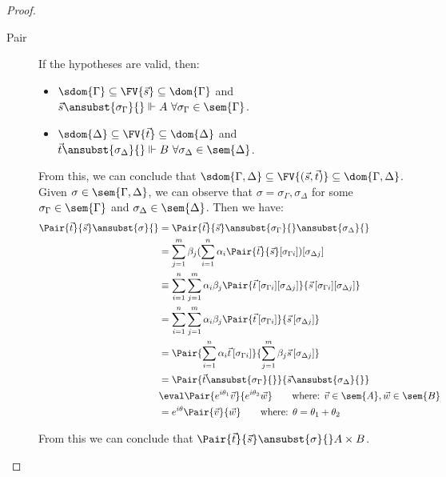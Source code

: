 \begin{proof}
\begin{description}
    \item[Pair] If the hypotheses are valid, then:

    \begin{itemize}
        \item $\sdom{\Gamma}\subseteq \FV{\vec s}\subseteq \dom{\Gamma}$ and $\vec s \ansubst{\sigma_\Gamma}{}\Vdash A\ \forall \sigma_\Gamma\in\sem{\Gamma}$.
        \item $\sdom{\Delta}\subseteq \FV{\vec t}\subseteq \dom{\Delta}$ and $\vec t\ansubst{\sigma_\Delta}{}\Vdash B\ \forall \sigma_\Delta\in\sem{\Delta}$.
    \end{itemize}
    
    From this, we can conclude that $\sdom{\Gamma,\Delta}\subseteq \FV{(\vec s, \vec t)}\subseteq \dom{\Gamma,\Delta}$. Given $\sigma\in\sem{\Gamma,\Delta}$, we can observe that $\sigma=\sigma_\Gamma,\sigma_\Delta$ for some  $\sigma_\Gamma\in\sem{\Gamma}$ and $\sigma_\Delta\in\sem{\Delta}$. Then we have:
    \begin{align*}
        \Pair{\vec{t}}{\vec{s}}\ansubst{\sigma}{} &= \Pair{\vec{t}}{\vec{s}}\ansubst{\sigma_\Gamma}{}\ansubst{\sigma_\Delta}{}\\
        &=\sum_{j=1}^{m} \beta_j (\sum_{i=1}^{n} \alpha_i \Pair{\vec{t}}{\vec{s}}[\sigma_{\Gamma i}])[\sigma_{\Delta j}]\\
        &\equiv\sum_{i=1}^{n}\sum_{j=1}^{m} \alpha_i \beta_j \Pair{\vec{t}\,[\sigma_{\Gamma i}][\sigma_{\Delta j}]}{\vec{s}\,[\sigma_{\Gamma i}][\sigma_{\Delta j}]}\\
        &=\sum_{i=1}^{n}\sum_{j=1}^{m} \alpha_i \beta_j \Pair{\vec{t}\,[\sigma_{\Gamma i}]}{\vec{s}\,[\sigma_{\Delta j}]}\\
        &=\Pair{\sum_{i=1}^{n} \alpha_i \vec{t}\, [\sigma_{\Gamma i}]}{\sum_{j=1}^{m} \beta_j \vec{s}\, [\sigma_{\Delta j}]}\\
        &=\Pair{\vec{t}\ansubst{\sigma_\Gamma}{}}{\vec{s}\ansubst{\sigma_\Delta}{}}\\
        &\eval \Pair{e^{i\theta_1}\vec v}{e^{i\theta_2}\vec w}\qquad\text{where: }\vec{v}\in\sem{A}, \vec{w}\in\sem{B}\\
        &= e^{i\theta} \Pair{\vec{v}}{\vec{w}}\qquad\text{where: }\theta=\theta_1 + \theta_2
    \end{align*}
    
    From this we can conclude that $\Pair{\vec t}{\vec{s}}\ansubst{\sigma}{}\real A\times B$.
    

\end{description}
\end{proof}
